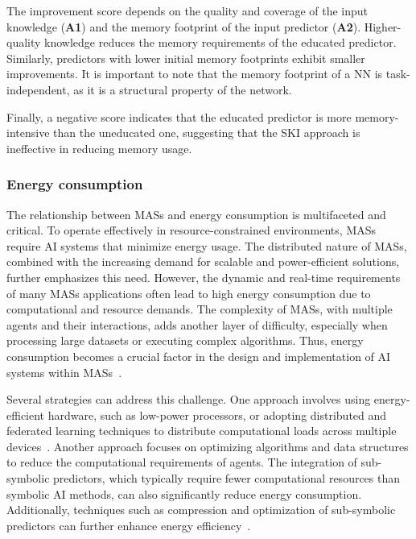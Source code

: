 %
The improvement score depends on the quality and coverage of the input knowledge (\textbf{A1}) and the memory footprint of the input predictor (\textbf{A2}).
%
Higher-quality knowledge reduces the memory requirements of the educated predictor.
%
Similarly, predictors with lower initial memory footprints exhibit smaller improvements.
%
It is important to note that the memory footprint of a \gls{NN} is task-independent, as it is a structural property of the network.

%
Finally, a negative score indicates that the educated predictor is more memory-intensive than the uneducated one, suggesting that the \gls{SKI} approach is ineffective in reducing memory usage.


\subsubsection{Energy consumption}\label{subsubsec:ski-meets-intelligent-agents-energy-consumption}
%
The relationship between \glspl{MAS} and energy consumption is multifaceted and critical.
%
To operate effectively in resource-constrained environments, \glspl{MAS} require \gls{AI} systems that minimize energy usage.
%
The distributed nature of \glspl{MAS}, combined with the increasing demand for scalable and power-efficient solutions, further emphasizes this need.
%
However, the dynamic and real-time requirements of many \glspl{MAS} applications often lead to high energy consumption due to computational and resource demands.
%
The complexity of \glspl{MAS}, with multiple agents and their interactions, adds another layer of difficulty, especially when processing large datasets or executing complex algorithms.
%
Thus, energy consumption becomes a crucial factor in the design and implementation of \gls{AI} systems within \glspl{MAS}~\cite{CITATION}.

%
Several strategies can address this challenge.
%
One approach involves using energy-efficient hardware, such as low-power processors, or adopting distributed and federated learning techniques to distribute computational loads across multiple devices~\cite{CITATION}.
%
Another approach focuses on optimizing algorithms and data structures to reduce the computational requirements of agents.
%
The integration of sub-symbolic predictors, which typically require fewer computational resources than symbolic \gls{AI} methods, can also significantly reduce energy consumption.
%
Additionally, techniques such as compression and optimization of sub-symbolic predictors can further enhance energy efficiency~\cite{CITATION}.

